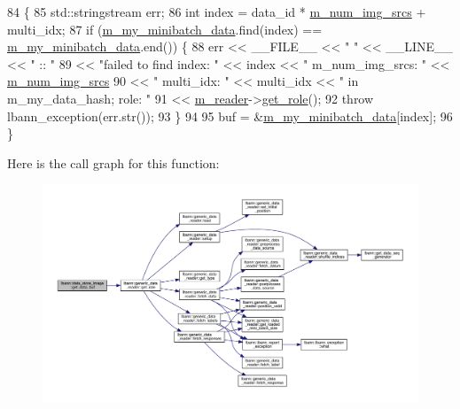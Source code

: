 \begin{DoxyCode}
84                                                                                               \{
85   std::stringstream err;
86   \textcolor{keywordtype}{int} index = data\_id * \hyperlink{classlbann_1_1data__store__image_a2f660053e7621a9cc70a7c4eef53c9cc}{m\_num\_img\_srcs} + multi\_idx;
87   \textcolor{keywordflow}{if} (\hyperlink{classlbann_1_1data__store__image_a627a08479de191dcef74e633c4cded8c}{m\_my\_minibatch\_data}.find(index) == \hyperlink{classlbann_1_1data__store__image_a627a08479de191dcef74e633c4cded8c}{m\_my\_minibatch\_data}.end()) \{
88     err << \_\_FILE\_\_ << \textcolor{stringliteral}{" "} << \_\_LINE\_\_ << \textcolor{stringliteral}{" :: "}
89         << \textcolor{stringliteral}{"failed to find index: "} << index << \textcolor{stringliteral}{" m\_num\_img\_srcs: "} << 
      \hyperlink{classlbann_1_1data__store__image_a2f660053e7621a9cc70a7c4eef53c9cc}{m\_num\_img\_srcs}
90         << \textcolor{stringliteral}{" multi\_idx: "} << multi\_idx << \textcolor{stringliteral}{" in m\_my\_data\_hash; role: "}
91         << \hyperlink{classlbann_1_1generic__data__store_afa49ced0ab64c632371ea52532a91ec2}{m\_reader}->\hyperlink{classlbann_1_1generic__data__reader_a92982e1b399f37e2ead5aa440883cba5}{get\_role}();
92     \textcolor{keywordflow}{throw} lbann\_exception(err.str());
93   \}
94 
95   buf = &\hyperlink{classlbann_1_1data__store__image_a627a08479de191dcef74e633c4cded8c}{m\_my\_minibatch\_data}[index];
96 \}
\end{DoxyCode}
Here is the call graph for this function\+:\nopagebreak
\begin{figure}[H]
\begin{center}
\leavevmode
\includegraphics[width=350pt]{classlbann_1_1data__store__image_aa9e47fb3cad58dda4eaddcccc9bfa523_cgraph}
\end{center}
\end{figure}
